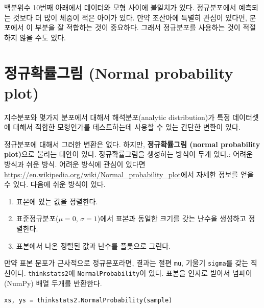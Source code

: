 백분위수 10번째 아래에서 데이터와 모형 사이에 불일치가 있다.
정규분포에서 예측되는 것보다 더 많이 체중이 적은 아이가 있다.
만약 조산아에 특별히 관심이 있다면, 분포에서 이 부분을 잘 적합하는 것이 중요하다.
그래서 정규분포를 사용하는 것이 적절하지 않을 수도 있다.


\section{정규확률그림 (Normal probability plot)}

지수분포와 몇가지 분포에서 대해서 해석분포(analytic distribution)가 특정 데이터셋에 대해서
적합한 모형인가를 테스트하는데 사용할 수 있는 간단한 변환이 있다.


정규분포에 대해서 그러한 변환은 없다. 하지만, 
{\bf 정규확률그림 (normal probability plot)}으로 불리는 대안이 있다.
정규확률그림을 생성하는 방식이 두개 있다.: 어려운 방식과 쉬운 방식.
어려운 방식에 관심이 있다면 \url{https://en.wikipedia.org/wiki/Normal_probability_plot}에서 
자세한 정보를 얻을 수 있다.
다음에 쉬운 방식이 있다.

\begin{enumerate}

\item 표본에 있는 값을 정렬한다.

\item 표준정규분포($\mu=0$, $\sigma=1$)에서 표본과 동일한 크기를 갖는 난수을 생성하고
정렬한다.

\item 표본에서 나온 정렬된 값과 난수를 플롯으로 그린다.

\end{enumerate}

만약 표본 분포가 근사적으로 정규분포라면, 결과는 
절편 {\tt mu}, 기울기 {\tt sigma}를 갖는 직선이다.
{\tt thinkstats2}에 {\tt NormalProbability}이 있다.
표본을 인자로 받아서 넘파이(NumPy) 배열 두개를 반환한다.

\begin{verbatim}
xs, ys = thinkstats2.NormalProbability(sample)
\end{verbatim}

